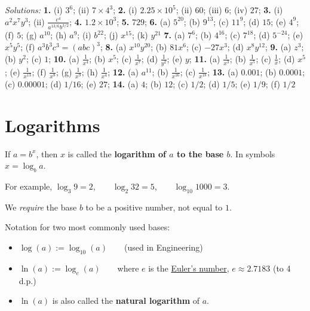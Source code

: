 \documentclass[
  12pt,
  oneside]{book}
\providecommand{\tightlist}{%
  \setlength{\itemsep}{0pt}\setlength{\parskip}{0pt}}
\theoremstyle{definition}
\theoremstyle{definition}
\theoremstyle{definition}
\theoremstyle{definition}
\theoremstyle{remark}
\begin{document}
\emph{Solutions:}
\textbf{1.} (i) \(3^6\); (ii) \(7\times 4^3\);
\textbf{2.} (i) \(2.25\times 10^5\); (ii) \(60\); (iii) \(6\); (iv) \(27\);
\textbf{3.} (i) \(a^2x^7y^3\); (ii) \(\frac{c^4}{a^{13/6}b^{3/2}}\);
\textbf{4.} \(1.2\times 10^3\);
\textbf{5.} \(729\);
\textbf{6.} (a) \(5^{20}\); (b) \(9^{13}\); (c) \(11^9\); (d) \(15\); (e) \(4^9\); (f) \(5\); (g) \(a^{10}\); (h) \(a^9\); (i) \(b^{22}\); (j) \(x^{15}\); (k) \(y^{21}\)
\textbf{7.} (a) \(7^6\); (b) \(4^{16}\); (c) \(7^{18}\); (d) \(5^{-24}\); (e) \(x^5y^5\); (f) \(a^3b^3c^3=(abc)^3\);
\textbf{8.} (a) \(x^{10}y^{20}\); (b) \(81x^6\); (c) \(-27x^3\); (d) \(x^8y^{12}\);
\textbf{9.} (a) \(z^3\); (b) \(y^2\); (c) \(1\);
\textbf{10.} (a) \(\frac{1}{x^4}\); (b) \(x^5\); (c) \(\frac{1}{x^7}\); (d) \(\frac{1}{y^2}\); (e) \(y\);
\textbf{11.} (a) \(\frac{1}{x^3}\); (b) \(\frac{1}{x^5}\); (c) \(\frac{1}{x}\); (d) \(x^5\); (e) \(\frac{1}{x^{13}}\); (f) \(\frac{1}{x^8}\); (g) \(\frac{1}{x^9}\); (h) \(\frac{1}{x^4}\);
\textbf{12.} (a) \(a^{11}\); (b) \(\frac{1}{x^{16}}\); (c) \(\frac{1}{x^{18}}\);
\textbf{13.} (a) \(0.001\); (b) \(0.0001\); (c) \(0.00001\); (d) \(1/16\); (e) \(27\);
\textbf{14.} (a) \(4\); (b) \(12\); (c) \(1/2\); (d) \(1/5\); (e) \(1/9\); (f) \(1/2\)

\hypertarget{logarithms}{%
\chapter{Logarithms}\label{logarithms}}

If \(a=b^x\), then \(x\) is called the \textbf{logarithm of \(a\) to the base \(b\)}. In symbols \(x=\log_b a\).

For example, \(\log_3 9=2\), ~ ~ \(\log_2 32=5\), ~ ~ \(\log_{10} 1000=3\).

We \emph{require} the base \(b\) to be a positive number, not equal to \(1\).

Notation for two most commonly used bases:

\begin{itemize}
\tightlist
\item
  \(\log(a) := \log_{10}(a)\) ~ ~ (used in Engineering)
\item
  \(\ln(a) := \log_e(a)\) ~ ~ where \(e\) is the \href{https://en.wikipedia.org/wiki/E_(mathematical_constant)}{Euler's number}, \(e \approx 2.7183\) (to 4 d.p.)
\item
  \(\ln(a)\) is also called the \textbf{natural logarithm} of \(a\).
\end{itemize}
\end{document}
